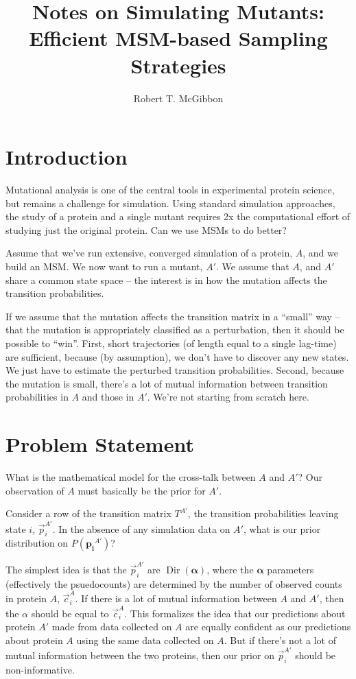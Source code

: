 \documentclass[twocolumn,floatfix,nofootinbib,aps]{revtex4-1}
\begin{document}
\title{Notes on Simulating Mutants: Efficient MSM-based Sampling Strategies}
\author{Robert T. McGibbon}

\begin{abstract}
\end{abstract}
\maketitle

\section{Introduction}
Mutational analysis is one of the central tools in experimental protein science, but remains a challenge for simulation. Using standard simulation
approaches, the study of a protein and a single mutant requires 2x the computational effort of studying just the original protein. Can we use MSMs to do better?

Assume that we've run extensive, converged simulation of a protein, $A$, and we build an MSM. We now want to run a mutant, $A'$. We assume that $A$, and $A'$ share a common state space -- the interest is in how the mutation affects
the transition probabilities.

If we assume that the mutation affects the transition matrix in a ``small'' way -- that the mutation is appropriately classified as a perturbation, then it should be possible to ``win''. First, short trajectories (of length equal to a single lag-time) are sufficient, because (by assumption), we don't have to discover any new states. We just have to estimate the perturbed transition probabilities. Second, because the mutation is small, there's a lot of mutual information between transition probabilities in $A$ and those in $A'$. We're not starting from scratch here.

\section{Problem Statement}
What is the mathematical model for the cross-talk between $A$ and $A'$? Our observation of $A$ must basically be the prior for $A'$.

Consider a row of the transition matrix $T^{A'}$, the transition probabilities
leaving state $i$, $\vec{p}_i^{A'}$. In the absence of any simulation data on $A'$, what is our prior distribution on $P(\mathbf{p_i}^{A'})$?

The simplest idea is that the $\vec{p}_i^{A'}$ are $\operatorname{Dir}(\mathbf{\alpha})$, where the $\mathbf{\alpha}$ parameters (effectively the psuedocounts) are determined by the number of observed counts in protein $A$, $\vec{c}_i^A$. If there is a lot of mutual information between $A$ and $A'$, then the $\alpha$ should be equal to $\vec{c}_i^A$. This formalizes the idea that our predictions about protein $A'$ made from data collected on $A$ are equally confident as our predictions about protein $A$ using the same data collected on $A$. But if there's not a lot of mutual information between the two proteins, then our prior on $\vec{p}_i^{A'}$ should be non-informative.
\end{document}
